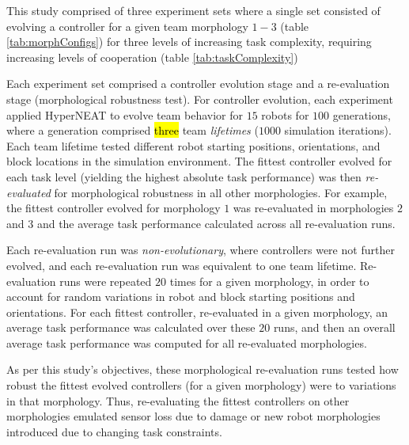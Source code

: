 This study comprised of three experiment sets where a single set consisted of evolving a controller for a given team morphology $1-3$ (table \ref{tab:morphConfigs}) for three levels of increasing task complexity, requiring increasing levels of cooperation (table \ref{tab:taskComplexity})

Each experiment set comprised a controller evolution stage and a re-evaluation stage
(morphological robustness test).
For controller evolution, each experiment applied HyperNEAT to evolve team behavior for
$15$ robots for $100$ generations,
where a generation comprised \hl{three} team \textit{lifetimes} ($1000$ simulation iterations).
Each team lifetime tested different robot starting positions, orientations, and block locations
in the simulation environment.
The fittest controller evolved for each task level (yielding the highest absolute task performance)
was then \textit{re-evaluated} for morphological robustness in all other morphologies.
For example, the fittest controller evolved for morphology $1$ was re-evaluated in morphologies
$2$ and $3$ and the average task performance calculated across all re-evaluation runs.

Each re-evaluation run was \textit{non-evolutionary}, where controllers were not further evolved,
and each re-evaluation run was equivalent to one team lifetime.
Re-evaluation runs were repeated $20$ times for a given morphology, in order to account for random variations in robot and block
starting positions and orientations.
For each fittest controller, re-evaluated in a given morphology, an average task performance was
calculated over these $20$ runs, and then an overall average task performance was computed for
all re-evaluated morphologies.

As per this study's objectives, these morphological re-evaluation
runs tested how robust the fittest evolved controllers (for a given morphology) were to variations
in that morphology.
Thus, re-evaluating the fittest controllers on other morphologies emulated sensor loss due
to damage or new robot morphologies introduced due to changing task constraints.

